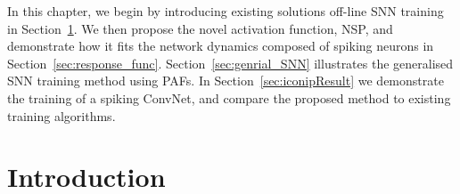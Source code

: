 In this chapter, we begin by introducing existing solutions \DIFdelbegin {}\DIFdelend \DIFaddbegin {}\DIFaddend off-line SNN training in Section~\ref{sec:intro_NSP}.
We then propose the novel activation function, NSP, and demonstrate how it fits the network dynamics composed of spiking neurons in Section~\ref{sec:response_func}.
Section~\ref{sec:genrial_SNN} illustrates the generalised SNN training method using PAFs.
In Section~\ref{sec:iconipResult} we demonstrate the training of a spiking ConvNet, and compare the proposed method to existing training algorithms.

\section{Introduction}
\label{sec:intro_NSP}

